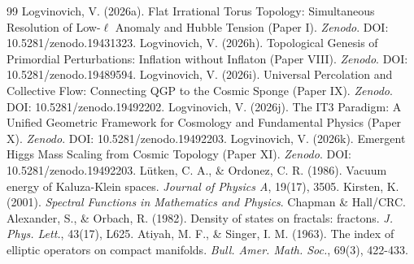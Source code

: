\documentclass[12pt,a4paper]{article}
\begin{document}
\begin{thebibliography}{99}
 Logvinovich, V. (2026a). Flat Irrational Torus Topology: Simultaneous Resolution of Low-$\ell$ Anomaly and Hubble Tension (Paper I). \textit{Zenodo}. DOI: 10.5281/zenodo.19431323.
 Logvinovich, V. (2026h). Topological Genesis of Primordial Perturbations: Inflation without Inflaton (Paper VIII). \textit{Zenodo}. DOI: 10.5281/zenodo.19489594.
 Logvinovich, V. (2026i). Universal Percolation and Collective Flow: Connecting QGP to the Cosmic Sponge (Paper IX). \textit{Zenodo}. DOI: 10.5281/zenodo.19492202.
 Logvinovich, V. (2026j). The IT3 Paradigm: A Unified Geometric Framework for Cosmology and Fundamental Physics (Paper X). \textit{Zenodo}. DOI: 10.5281/zenodo.19492203.
 Logvinovich, V. (2026k). Emergent Higgs Mass Scaling from Cosmic Topology (Paper XI). \textit{Zenodo}. DOI: 10.5281/zenodo.19492203.
 L{\"u}tken, C. A., \& Ordonez, C. R. (1986). Vacuum energy of Kaluza-Klein spaces. \textit{Journal of Physics A}, 19(17), 3505.
 Kirsten, K. (2001). \textit{Spectral Functions in Mathematics and Physics}. Chapman \& Hall/CRC.
 Alexander, S., \& Orbach, R. (1982). Density of states on fractals: fractons. \textit{J. Phys. Lett.}, 43(17), L625.
 Atiyah, M. F., \& Singer, I. M. (1963). The index of elliptic operators on compact manifolds. \textit{Bull. Amer. Math. Soc.}, 69(3), 422-433.
\end{thebibliography}
\end{document}
